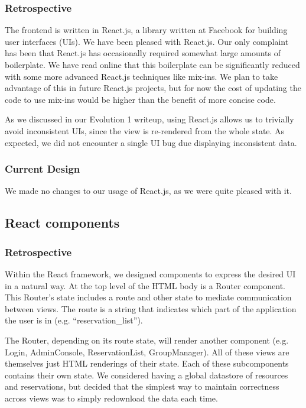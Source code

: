 \documentclass[12pt]{article}
\begin{document}
\subsubsection{Retrospective}
The frontend is written in React.js, a library written at Facebook for building user interfaces (UIs). We have been pleased with React.js. Our only complaint has been that React.js has occasionally required somewhat large amounts of boilerplate. We have read online that this boilerplate can be significantly reduced with some more advanced React.js techniques like mix-ins. We plan to take advantage of this in future React.js projects, but for now the cost of updating the code to use mix-ins would be higher than the benefit of more concise code.

As we discussed in our Evolution 1 writeup, using React.js allows us to trivially avoid inconsistent UIs, since the view is re-rendered from the whole state. As expected, we did not encounter a single UI bug due displaying inconsistent data.

\subsubsection{Current Design}
We made no changes to our usage of React.js, as we were quite pleased with it.

\subsection{React components}
\subsubsection{Retrospective}
Within the React framework, we designed components to express the desired UI in a natural way. At the top level of the HTML body is a Router component. This Router's state includes a route and other state to mediate communication between views. The route is a string that indicates which part of the application the user is in (e.g. ``reservation\_list'').

The Router, depending on its route state, will render another component (e.g. Login, AdminConsole, ReservationList, GroupManager). All of these views are themselves just HTML renderings of their state. Each of these subcomponents contains their own state. We considered having a global datastore of resources and reservations, but decided that the simplest way to maintain correctness across views was to simply redownload the data each time.
\end{document}
